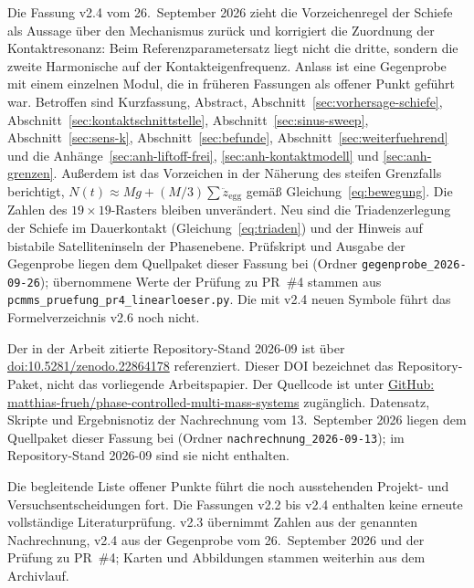 \documentclass[12pt,a4paper]{report}
\begin{document}
Die Fassung v2.4 vom 26.~September 2026 zieht die Vorzeichenregel der
Schiefe als Aussage über den Mechanismus zurück und korrigiert die
Zuordnung der Kontaktresonanz: Beim Referenzparametersatz liegt nicht die
dritte, sondern die zweite Harmonische auf der Kontakteigenfrequenz.
Anlass ist eine Gegenprobe mit einem einzelnen Modul, die in früheren
Fassungen als offener Punkt geführt war. Betroffen sind Kurzfassung,
Abstract, Abschnitt~\ref{sec:vorhersage-schiefe},
Abschnitt~\ref{sec:kontaktschnittstelle}, Abschnitt~\ref{sec:sinus-sweep},
Abschnitt~\ref{sec:sens-k}, Abschnitt~\ref{sec:befunde},
Abschnitt~\ref{sec:weiterfuehrend} und die
Anhänge~\ref{sec:anh-liftoff-frei}, \ref{sec:anh-kontaktmodell} und
\ref{sec:anh-grenzen}. Außerdem ist das Vorzeichen in der Näherung des
steifen Grenzfalls berichtigt, $N(t) \approx Mg + (M/3)\sum
\ddot{z}_{\mathrm{egg}}$ gemäß Gleichung~\eqref{eq:bewegung}. Die Zahlen
des $19\times19$-Rasters bleiben unverändert. Neu sind die
Triadenzerlegung der Schiefe im Dauerkontakt
(Gleichung~\eqref{eq:triaden}) und der Hinweis auf bistabile
Satelliteninseln der Phasenebene. Prüfskript und Ausgabe der Gegenprobe
liegen dem Quellpaket dieser Fassung bei (Ordner
\texttt{gegenprobe\_2026-09-26}); übernommene Werte der Prüfung zu
PR~\#4 stammen aus \texttt{pcmms\_pruefung\_pr4\_linearloeser.py}. Die
mit v2.4 neuen Symbole führt das Formelverzeichnis v2.6 noch nicht.

Der in der Arbeit zitierte Repository-Stand 2026-09 ist über
\href{https://doi.org/10.5281/zenodo.22864178}{doi:10.5281/zenodo.22864178}
referenziert. Dieser DOI bezeichnet das Repository-Paket, nicht das
vorliegende Arbeitspapier. Der Quellcode ist unter
\href{https://github.com/matthias-frueh/phase-controlled-multi-mass-systems}{GitHub: matthias-frueh/phase-controlled-multi-mass-systems}
zugänglich. Datensatz, Skripte und Ergebnisnotiz der Nachrechnung vom
13.~September 2026 liegen dem Quellpaket dieser Fassung bei (Ordner
\texttt{nachrechnung\_2026-09-13}); im Repository-Stand 2026-09 sind sie
nicht enthalten.

Die begleitende Liste offener Punkte führt die noch ausstehenden
Projekt- und Versuchsentscheidungen fort. Die Fassungen v2.2 bis v2.4 enthalten keine erneute vollständige
Literaturprüfung. v2.3 übernimmt Zahlen aus der genannten Nachrechnung,
v2.4 aus der Gegenprobe vom 26.~September 2026 und der Prüfung zu
PR~\#4; Karten und Abbildungen stammen weiterhin aus dem Archivlauf.
\end{document}
